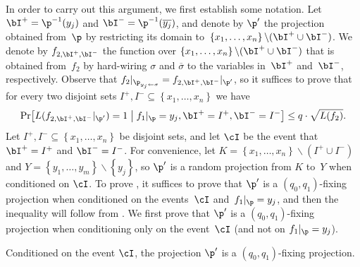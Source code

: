 \documentclass{toc}
\begin{document}
In order to carry out this argument, we first establish some notation.
Let $\bI^{+}=\p^{-1}(y_{j})$ and $\bI^{-}=\p^{-1}(\overline{y_{j}})$,
and denote by $\p'$ the projection obtained from~$\p$ by restricting
its domain to~$\left\{ x_{1},\ldots,x_{n}\right\} \backslash(\bI^{+}\cup\bI^{-})$.
We denote by $f_{2,\bI^{+},\bI^{-}}$ the function over $\left\{ x_{1},\ldots,x_{n}\right\} \backslash(\bI^{+}\cup\bI^{-})$
that is obtained from~$f_{2}$ by hard-wiring $\sigma$ and $\overline{\sigma}$
to the variables in~$\bI^{+}$ and~$\bI^{-}$, respectively. Observe
that $f_{2}|_{\p_{y_{j}\gets\sigma}}=f_{2,\bI^{+},\bI^{-}}|_{\p'}$,
so it suffices to prove that for every two disjoint sets $I^{+},I^{-}\subseteq\left\{ x_{1},\ldots,x_{n}\right\} $
we have 
\begin{equation}
\Pr\!\left[L(f_{2,\bI^{+},\bI^{-}}|_{\p'})=1\;\middle|\;f_{1}|_{\p}=y_{j},\bI^{+}=I^{+},\bI^{-}=I^{-}\right]\le q\cdot\sqrt{L(f_{2})}.\label{eq:shrinkage-to-two-literals-conditioned-on-I}
\end{equation}
Let $I^{+},I^{-}\subseteq\left\{ x_{1},\ldots,x_{n}\right\} $ be
disjoint sets, and let $\cI$ be the event that $\bI^{+}=I^{+}$ and
$\bI^{-}=I^{-}$. For convenience, let $K=\left\{ x_{1},\ldots,x_{n}\right\} \backslash(I^{+}\cup I^{-})$
and $Y=\left\{ y_{1},\ldots,y_{m}\right\} \backslash\left\{ y_{j}\right\} $,
so $\p'$ is a random projection from $K$ to~$Y$ when conditioned
on $\cI$. To prove ,
it suffices to prove that $\p'$ is a $(q_{0},q_{1})$-fixing projection
when conditioned on the events~$\cI$ and~$f_{1}|_{\p}=y_{j}$,
and then the inequality will follow from .
We first prove that $\p'$ is a $(q_{0},q_{1})$-fixing projection
when conditioning only on the event~$\cI$ (and not on $f_{1}|_{\p}=y_{j}$). 
\begin{proposition}
Conditioned on the event $\cI$, the projection $\p'$ is a $(q_{0},q_{1})$-fixing
projection. 
\end{proposition}
\end{document}
